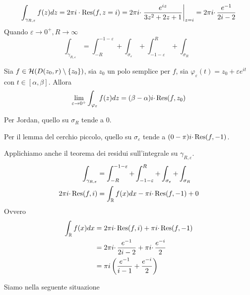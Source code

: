 \begin{equation*}
\int _{\gamma _{R,\varepsilon }} f(z)dz=2\pi i\cdot \operatorname{Res}  (f,z=i)=2\pi i\cdotp \left. \frac{e^{iz}}{3z^{2} +2z+1}\right| _{z=i} =2\pi i\cdotp \frac{e^{-1}}{2i-2}
\end{equation*}
Quando $\varepsilon \rightarrow 0^{+} ,R\rightarrow \infty $
\begin{equation*}
\int _{\gamma _{R,\varepsilon }} =\int ^{-1-\varepsilon }_{-R} +\int _{\sigma _{\varepsilon }} +\int ^{R}_{-1-\varepsilon } +\int _{\sigma _{R}}
\end{equation*}
\begin{thm}
 Sia $f\in \mathcal{H} ( D( z_{0} ,r) \setminus \{z_{0}\})$, sia $z_{0}$ un polo semplice per $f$, sia $\varphi _{\varepsilon }( t) =z_{0} +\varepsilon e^{it}$ con $t\in [ \alpha ,\beta ]$. Allora
\begin{equation*}
\lim _{\varepsilon \rightarrow 0^{+}}\int _{\varphi _{\varepsilon }} f( z) dz=( \beta -\alpha ) i\cdotp \operatorname{Res} ( f,z_{0})
\end{equation*}
\end{thm}
Per Jordan, quello su $\sigma _{R}$ tende a $0$.

Per il lemma del cerchio piccolo, quello su $\sigma _{\varepsilon }$ tende a $( 0-\pi ) i\cdotp \operatorname{Res} ( f,-1)$.

Applichiamo anche il teorema dei residui sull'integrale su $\gamma _{R,\varepsilon }$.
\begin{equation*}
\begin{aligned}
\int _{\gamma _{R,\varepsilon }} & =\int ^{-1-\varepsilon }_{-R} +\int ^{R}_{-1-\varepsilon } +\int _{\sigma _{\varepsilon }} +\int _{\sigma _{R}}\\
2\pi i\cdotp \operatorname{Res}  (f,i) & =\int _{\mathbb{R} } f( x) dx-\pi i\cdotp \operatorname{Res} ( f,-1) +0
\end{aligned}
\end{equation*}
Ovvero
\begin{equation*}
\begin{aligned}
\int _{\mathbb{R} } f( x) dx & =2\pi i\cdotp \operatorname{Res}  (f,i)+\pi i\cdotp \operatorname{Res} ( f,-1)\\
 & =2\pi i\cdotp \frac{e^{-1}}{2i-2} +\pi i\cdotp \frac{e^{-i}}{2}\\
 & =\pi i\left(\frac{e^{-1}}{i-1} +\frac{e^{-i}}{2}\right)
\end{aligned}
\end{equation*}
\Soluzione

Siamo nella seguente situazione


